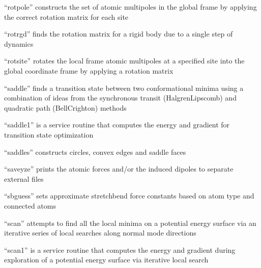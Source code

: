 \documentclass[letterpaper,11pt,english]{sphinxmanual}
\begin{document}
\sphinxAtStartPar
{}

\sphinxAtStartPar
“rotpole” constructs the set of atomic multipoles in the global frame by applying the correct rotation matrix for each site

\sphinxAtStartPar
{}

\sphinxAtStartPar
“rotrgd” finds the rotation matrix for a rigid body due to a single step of dynamics

\sphinxAtStartPar
{}

\sphinxAtStartPar
“rotsite” rotates the local frame atomic multipoles at a specified site into the global coordinate frame by applying a rotation matrix

\sphinxAtStartPar
{}

\sphinxAtStartPar
“saddle” finds a transition state between two conformational minima using a combination of ideas from the synchronous transit (Halgren\sphinxhyphen{}Lipscomb) and quadratic path (Bell\sphinxhyphen{}Crighton) methods

\sphinxAtStartPar
{}

\sphinxAtStartPar
“saddle1” is a service routine that computes the energy and gradient for transition state optimization

\sphinxAtStartPar
{}

\sphinxAtStartPar
“saddles” constructs circles, convex edges and saddle faces

\sphinxAtStartPar
{}

\sphinxAtStartPar
“saveyze” prints the atomic forces and/or the induced dipoles to separate external files

\sphinxAtStartPar
{}

\sphinxAtStartPar
“sbguess” sets approximate stretch\sphinxhyphen{}bend force constants based on atom type and connected atoms

\sphinxAtStartPar
{}

\sphinxAtStartPar
“scan” attempts to find all the local minima on a potential energy surface via an iterative series of local searches along normal mode directions

\sphinxAtStartPar
{}

\sphinxAtStartPar
“scan1” is a service routine that computes the energy and gradient during exploration of a potential energy surface via iterative local search
\end{document}
